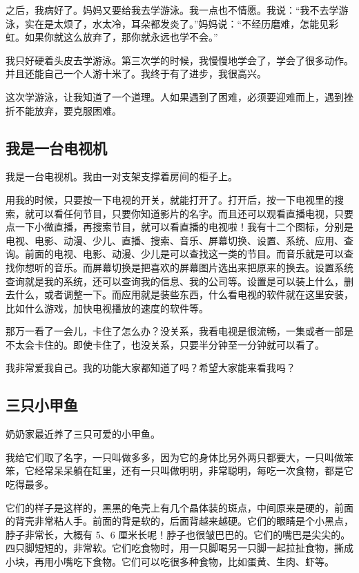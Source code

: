 \documentclass[UTF8,a4paper,titlepage,twoside,10.5pt]{article}
\begin{document}
之后，我病好了。妈妈又要给我去学游泳。我一点也不情愿。我说：“我不去学游泳，实在是太烦了，水太冷，耳朵都发炎了。”妈妈说：“不经历磨难，怎能见彩虹。如果你就这么放弃了，那你就永远也学不会。”

我只好硬着头皮去学游泳。第三次学的时候，我慢慢地学会了，学会了很多动作。并且还能自己一个人游十米了。我终于有了进步，我很高兴。

这次学游泳，让我知道了一个道理。人如果遇到了困难，必须要迎难而上，遇到挫折不能放弃，要克服困难。

\subsection{我是一台电视机}
\label{sec:orgf67da71}

我是一台电视机。我由一对支架支撑着房间的柜子上。

用我的时候，只要按一下电视的开关，就能打开了。打开后，按一下电视里的搜索，就可以看任何节目，只要你知道影片的名字。而且还可以观看直播电视，只要点一下小微直播，再搜索节目，就可以看直播的电视啦！我有十二个图标，分别是电视、电影、动漫、少儿、直播、搜索、音乐、屏幕切换、设置、系统、应用、查询。前面的电视、电影、动漫、少儿是可以查找这一类的节目。而音乐就是可以查找你想听的音乐。而屏幕切换是把喜欢的屏幕图片选出来把原来的换去。设置系统查询就是我的系统，还可以查询我的信息、我的公司等。设置是可以装上什么，删去什么，或者调整一下。而应用就是装些东西，什么看电视的软件就在这里安装，比如什么游戏，加快电视播放的速度的软件等。

那万一看了一会儿，卡住了怎么办？没关系，我看电视是很流畅，一集或者一部是不太会卡住的。即使卡住了，也没关系，只要半分钟至一分钟就可以看了。

我非常爱我自己。我的功能大家都知道了吗？希望大家能来看我吗？

\subsection{三只小甲鱼}
\label{sec:org47028ee}

奶奶家最近养了三只可爱的小甲鱼。

我给它们取了名字，一只叫做多多，因为它的身体比另外两只都要大，一只叫做笨笨，它经常呆呆躺在缸里，还有一只叫做明明，非常聪明，每吃一次食物，都是它吃得最多。

它们的样子是这样的，黑黑的龟壳上有几个晶体装的斑点，中间原来是硬的，前面的背壳非常粘人手。前面的背是软的，后面背越来越硬。它们的眼睛是个小黑点，脖子非常长，大概有 5、6 厘米长呢！脖子也很皱巴巴的。它们的嘴巴是尖尖的。四只脚短短的，非常软。它们吃食物时，用一只脚喝另一只脚一起拉扯食物，撕成小块，再用小嘴吃下食物。它们可以吃很多种食物，比如蛋黄、生肉、虾等。
\end{document}
